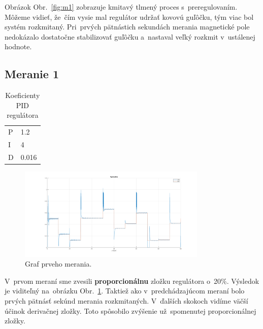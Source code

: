 \documentclass{article}
\begin{document}
Obrázok Obr.~\ref{fig:m1} zobrazuje kmitavý tlmený proces s~preregulovaním. Môžeme vidieť, že~čím vysie mal
regulátor udržať kovovú guľôčku, tým viac bol systém rozkmitaný. Pri~prvých pätnástich sekundách merania
magnetické pole nedokázalo dostatočne stabilizovať guľôčku a~nastaval veľký rozkmit v~ustálenej hodnote.

\clearpage

\subsection{Meranie 1}
\label{sec:meranie1}

\begin{table}[!htbp]
	\caption{Koeficienty PID regulátora}
	\label{tab:t1}
	\begin{center}
		\begin{tabular}[c]{|l|l|}
			\hline
			P & 1.2 \\
			I & 4 \\
			D & 0.016 \\
			\hline
		\end{tabular}
	\end{center}
\end{table}

\begin{figure}[!htbp]
	\begin{center}
		\includegraphics[width=0.8\textwidth]{./include/m2.png}
	\end{center}
	\caption{Graf prveho merania.}
	\label{fig:meranie1}
\end{figure}

V~prvom meraní sme zvesili \textbf{proporcionálnu} zložku regulátora o~20\%. Výsledok je viditeľný
na~obrázku Obr.~\ref{fig:meranie1}. Taktiež ako v~predchádzajúcom meraní bolo prvých pätnásť sekúnd
merania rozkmitaných. V~ďalších skokoch vidíme väčší účinok derivačnej zložky. Toto spôsobilo zvýšenie
už~spomenutej proporcionálnej zložky.

\clearpage
\end{document}
